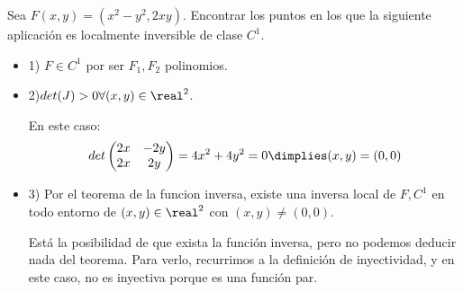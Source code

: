 \documentclass{apuntes}
\begin{document}
\begin{problem}[inventado]
\label{inventado}
Sea $F(x,y) = (x^2-y^2,2xy)$. Encontrar los puntos en los que la siguiente aplicación es localmente inversible de clase $C^1$.
\solution
\begin{itemize}
 \item 1) $F \in C^1$ por ser $F_1,F_2$ polinomios.
 \item 2)$det(J)>0 \forall (x,y)\in \real^2$. 
 
 En este caso: $$det\begin{pmatrix}
                  2x&-2y\\
                  2x&2y
                 \end{pmatrix} = 4x^2 + 4y^2 = 0 \dimplies (x,y) = (0,0)$$           
 \item 3) Por el teorema de la funcion inversa, existe una inversa local de $F,C^1$ en todo entorno de $(x,y) \in \real^2$ con $(x,y)\neq (0,0)$. 
 
 Está la posibilidad de que exista la función inversa, pero no podemos deducir nada del teorema. Para verlo, recurrimos a la definición de inyectividad, y en este caso, no es inyectiva porque es una función par.
 \end{itemize}
 \end{problem}
\end{document}
